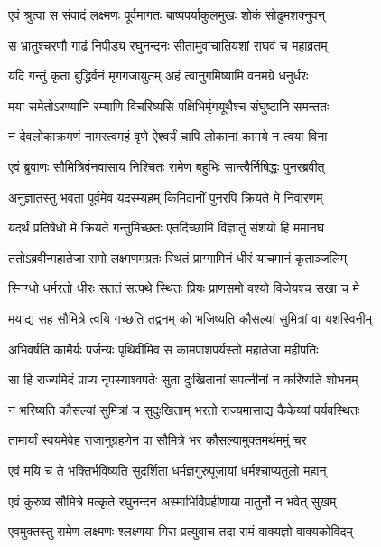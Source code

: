 
\twolineshloka
{एवं श्रुत्वा स संवादं लक्ष्मणः पूर्वमागतः}
{बाष्पपर्याकुलमुखः शोकं सोढुमशक्नुवन्} %

\twolineshloka
{स भ्रातुश्चरणौ गाढं निपीड्य रघुनन्दनः}
{सीतामुवाचातियशां राघवं च महाव्रतम्} %

\twolineshloka
{यदि गन्तुं कृता बुद्धिर्वनं मृगगजायुतम्}
{अहं त्वानुगमिष्यामि वनमग्रे धनुर्धरः} %

\twolineshloka
{मया समेतोऽरण्यानि रम्याणि विचरिष्यसि}
{पक्षिभिर्मृगयूथैश्च संघुष्टानि समन्ततः} %

\twolineshloka
{न देवलोकाक्रमणं नामरत्वमहं वृणे}
{ऐश्वर्यं चापि लोकानां कामये न त्वया विना} %

\twolineshloka
{एवं ब्रुवाणः सौमित्रिर्वनवासाय निश्चितः}
{रामेण बहुभिः सान्त्वैर्निषिद्धः पुनरब्रवीत्} %

\twolineshloka
{अनुज्ञातस्तु भवता पूर्वमेव यदस्म्यहम्}
{किमिदानीं पुनरपि क्रियते मे निवारणम्} %

\twolineshloka
{यदर्थं प्रतिषेधो मे क्रियते गन्तुमिच्छतः}
{एतदिच्छामि विज्ञातुं संशयो हि ममानघ} %

\twolineshloka
{ततोऽब्रवीन्महातेजा रामो लक्ष्मणमग्रतः}
{स्थितं प्राग्गामिनं धीरं याचमानं कृताञ्जलिम्} %

\twolineshloka
{स्निग्धो धर्मरतो धीरः सततं सत्पथे स्थितः}
{प्रियः प्राणसमो वश्यो विजेयश्च सखा च मे} %

\twolineshloka
{मयाद्य सह सौमित्रे त्वयि गच्छति तद्वनम्}
{को भजिष्यति कौसल्यां सुमित्रां वा यशस्विनीम्} %

\twolineshloka
{अभिवर्षति कामैर्यः पर्जन्यः पृथिवीमिव}
{स कामपाशपर्यस्तो महातेजा महीपतिः} %

\twolineshloka
{सा हि राज्यमिदं प्राप्य नृपस्याश्वपतेः सुता}
{दुःखितानां सपत्नीनां न करिष्यति शोभनम्} %

\twolineshloka
{न भरिष्यति कौसल्यां सुमित्रां च सुदुःखिताम्}
{भरतो राज्यमासाद्य कैकेय्यां पर्यवस्थितः} %

\twolineshloka
{तामार्यां स्वयमेवेह राजानुग्रहणेन वा}
{सौमित्रे भर कौसल्यामुक्तमर्थममुं चर} %

\twolineshloka
{एवं मयि च ते भक्तिर्भविष्यति सुदर्शिता}
{धर्मज्ञगुरुपूजायां धर्मश्चाप्यतुलो महान्} %

\twolineshloka
{एवं कुरुष्व सौमित्रे मत्कृते रघुनन्दन}
{अस्माभिर्विप्रहीणाया मातुर्नो न भवेत् सुखम्} %

\twolineshloka
{एवमुक्तस्तु रामेण लक्ष्मणः श्लक्ष्णया गिरा}
{प्रत्युवाच तदा रामं वाक्यज्ञो वाक्यकोविदम्} %

